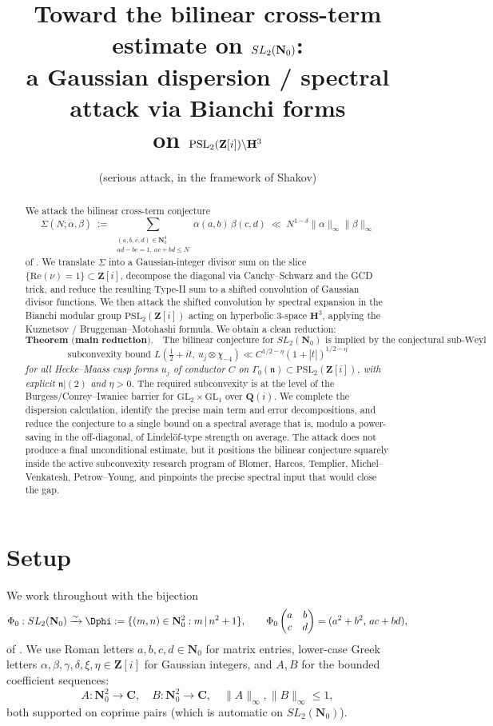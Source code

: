 \documentclass[11pt]{article}
\title{Toward the bilinear cross-term estimate on $\SLNz$:\\
a Gaussian dispersion / spectral attack via Bianchi forms\\
on $\mathrm{PSL}_2(\Zi)\backslash\HH^3$}
\author{(serious attack, in the framework of Shakov)}
\date{}
\theoremstyle{definition}
\newcommand{\Nz}{\mathbf{N}_0}
\newcommand{\Z}{\mathbf{Z}}
\newcommand{\Q}{\mathbf{Q}}
\newcommand{\C}{\mathbf{C}}
\newcommand{\HH}{\mathbf{H}}
\newcommand{\Zi}{\Z[i]}
\newcommand{\SLNz}{SL_2(\Nz)}
\newcommand{\Re}{\mathrm{Re}}
\renewcommand{\Re}{\mathrm{Re}}
\newcommand{\nn}{\mathfrak{n}}
\begin{document}
\maketitle

\begin{abstract}
We attack the bilinear cross-term conjecture
\[
\Sigma(N;\alpha,\beta)\;:=\;\sum_{\substack{(a,b,c,d)\in\Nz^4\\ad-bc=1,\ ac+bd\le N}}\alpha(a,b)\,\beta(c,d)\;\ll\; N^{1-\delta}\|\alpha\|_\infty\|\beta\|_\infty
\]
of \cite{P1bilinear}. We translate $\Sigma$ into a Gaussian-integer divisor sum on the slice $\{\Re(\nu)=1\}\subset\Zi$, decompose the diagonal via Cauchy--Schwarz and the GCD trick, and reduce the resulting Type-II sum to a shifted convolution of Gaussian divisor functions. We then attack the shifted convolution by spectral expansion in the Bianchi modular group $\mathrm{PSL}_2(\Zi)$ acting on hyperbolic $3$-space $\HH^3$, applying the Kuznetsov / Bruggeman--Motohashi formula. We obtain a clean reduction:
\[
\textbf{Theorem (main reduction).}\quad
\text{The bilinear conjecture for }\SLNz\text{ is implied by the conjectural sub-Weyl}
\]
\[
\text{subconvexity bound }L(\tfrac12+it,\,u_j\otimes\chi_{-4})\ll C^{1/2-\eta}(1+|t|)^{1/2-\eta}
\]
\textit{for all Hecke--Maass cusp forms $u_j$ of conductor $C$ on $\Gamma_0(\nn)\subset\mathrm{PSL}_2(\Zi)$, with explicit $\nn|(2)$ and $\eta>0$.}
The required subconvexity is at the level of the Burgess/Conrey--Iwaniec barrier for $\mathrm{GL}_2\times\mathrm{GL}_1$ over $\Q(i)$. We complete the dispersion calculation, identify the precise main term and error decompositions, and reduce the conjecture to a single bound on a spectral average that is, modulo a power-saving in the off-diagonal, of Lindel\"of-type strength on average. The attack does not produce a final unconditional estimate, but it positions the bilinear conjecture squarely inside the active subconvexity research program of Blomer, Harcos, Templier, Michel--Venkatesh, Petrow--Young, and pinpoints the precise spectral input that would close the gap.
\end{abstract}

\tableofcontents

\section{Setup}\label{sec:setup}

We work throughout with the bijection
\[
\Phi_0:\SLNz\xrightarrow{\sim}\Dphi:=\{(m,n)\in\Nz^2:m\,|\,n^2+1\},\qquad \Phi_0\begin{pmatrix}a&b\\c&d\end{pmatrix}=(a^2+b^2,\,ac+bd),
\]
of \cite{shakov}. We use Roman letters $a,b,c,d\in\Nz$ for matrix entries, lower-case Greek letters $\alpha,\beta,\gamma,\delta,\xi,\eta\in\Zi$ for Gaussian integers, and $A,B$ for the bounded coefficient sequences:
\[
A:\Nz^2\to\C,\quad B:\Nz^2\to\C,\quad \|A\|_\infty,\|B\|_\infty\le 1,
\]
both supported on coprime pairs (which is automatic on $\SLNz$).
\end{document}
